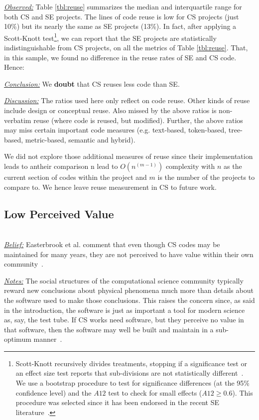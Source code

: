 \documentclass[sigconf,review,anonymous]{acmart}
\newenvironment{RQ}{\vspace{1mm}\begin{tcolorbox}[enhanced,width=3.4in,size=fbox,colback=red!5!white,drop shadow southeast,sharp corners]}{\end{tcolorbox}}
\begin{document}
\noindent \textit{\underline{Observed:}} Table \ref{tbl:reuse} summarizes the median and interquartile range for both CS and SE projects. The lines of code reuse is low for CS projects (just 10\%) but its nearly the same as SE projects (13\%). In fact,
after applying a Scott-Knott test\footnote{
Scott-Knott recursively divides treatments, stopping if
a significance test or an effect size test reports that sub-divisions are
not statistically different~\cite{mittas2013ranking, ghotra15}.
We use a bootstrap procedure to test for significance differences (at the 95\% confidence level) 
and the $\mathit{A12}$ test to check for small effects ($\mathit{A12} \ge 0.6$).
This procedure was selected
since it has been endorsed in the recent SE literature~\cite{mittas2013ranking,arcuri2011practical}.}, 
we can report that the SE projects are statistically
indistinguishable from CS projects, on all the metrics of Table \ref{tbl:reuse}. 
That, in this sample, we found no difference in the reuse rates
of SE and CS code. Hence: 
\begin{RQ} 
\textit{\underline{Conclusion:}} We \textbf{doubt} that CS reuses less code  than SE. 
\end{RQ}

\noindent \textit{\underline{Discussion:}} 
The ratios used here only reflect on code reuse.
Other kinds of reuse include design or conceptual reuse. 
Also missed by the above ratios is non-verbatim reuse (where code is reused, but modified).
Further, the above ratios may miss certain important code measures
(e.g. text-based, token-based, tree-based, metric-based, semantic and hybrid).

We did not explore those additional measures of reuse since
their implementation leads to antheir comparison n lead to $O(n^{(m-1)})$ complexity with $n$ as the current section of codes within the project and $m$ is the number of the projects to compare to. We hence leave reuse measurement in CS to  future work.

\subsection{Low Perceived Value} ~\\
\noindent \textit{\underline{Belief:}} 
Easterbrook et al. comment that even though CS codes
may be maintained for many years,
they are not perceived to have value within their own community~\cite{faulk09_secs, segal07_enduser, easterbrook_cs, boyle09_lessons}.

\noindent \textit{\underline{Notes:}} The social structures of the computational science community
typically reward new conclusions about physical phenomena much more than
details about the software used
to make those conclusions. This raises the concern since, as said in the introduction, the software is just as important a tool for modern science as, say, the test tube. If CS works need software,
but they perceive no value in that software, then the software may well be built and maintain in a sub-optimum manner~\cite{sanders08_risk}. 
\end{document}
